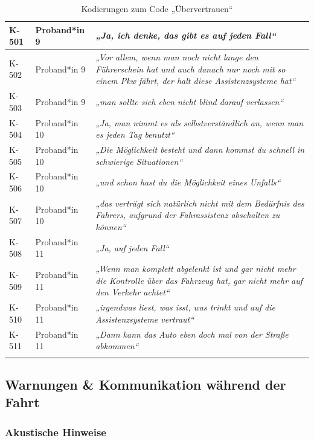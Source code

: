 {\begin{xltabular}{\textwidth}{
    |P{0.10\textwidth}
    |P{0.17\textwidth}
    |Y|
}
\hline
K-501 & Proband*in 9 & \textit{„Ja, ich denke, das gibt es auf jeden Fall“} \\
\hline
K-502 & Proband*in 9 & \textit{„Vor allem, wenn man noch nicht lange den Führerschein hat und auch danach nur noch mit so einem Pkw fährt, der halt diese Assistenzsysteme hat“} \\
\hline
K-503 & Proband*in 9 & \textit{„man sollte sich eben nicht blind darauf verlassen“} \\
\hline
K-504 & Proband*in 10 & \textit{„Ja, man nimmt es als selbstverständlich an, wenn man es jeden Tag benutzt“} \\
\hline
K-505 & Proband*in 10 & \textit{„Die Möglichkeit besteht und dann kommst du schnell in schwierige Situationen“} \\
\hline
K-506 & Proband*in 10 & \textit{„und schon hast du die Möglichkeit eines Unfalls“} \\
\hline
K-507 & Proband*in 10 & \textit{„das verträgt sich natürlich nicht mit dem Bedürfnis des Fahrers, aufgrund der Fahrassistenz abschalten zu können“} \\
\hline
K-508 & Proband*in 11 & \textit{„Ja, auf jeden Fall“} \\
\hline
K-509 & Proband*in 11 & \textit{„Wenn man komplett abgelenkt ist und gar nicht mehr die Kontrolle über das Fahrzeug hat, gar nicht mehr auf den Verkehr achtet“} \\
\hline
K-510 & Proband*in 11 & \textit{„irgendwas liest, was isst, was trinkt und auf die Assistenzsysteme vertraut“} \\
\hline
K-511 & Proband*in 11 & \textit{„Dann kann das Auto eben doch mal von der Straße abkommen“} \\
\hline
\caption{Kodierungen zum Code „Übervertrauen“}\label{tab:kodiernachweis-uebervertrauen}\\
\end{xltabular}
}

\clearpage
\subsection{Warnungen \& Kommunikation während der Fahrt}
\label{subsec:kodiernachweis-warnungen-und-kommunikation-waehrend-der-fahrt}

\subsubsection{Akustische Hinweise}

